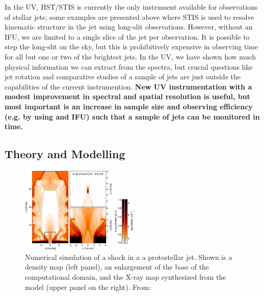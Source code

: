 \documentclass[12pt]{article}
\begin{document}
In the UV, HST/STIS is currently the only instrument available for observations of stellar jets; some examples are presented above where STIS is used to resolve kinematic structure in the jet using long-slit observations. However, without an IFU, we are limited to a single slice of the jet per observation. It is possible to step the long-slit on the sky, but this is prohibitively expensive in observing time for all but one or two of the brightest jets. In the UV, we have shown how much physical information we can extract from the spectra, but crucial questions like jet rotation and comparative studies of a sample of jets are just outside the capabilities of the current instrumention. \textbf{New UV instrumentation with a modest improvement in spectral and spatial resolution is useful, but most important is an increase in sample size and observing efficiency (e.g. by using and IFU) such that a sample of jets can be monitored in time. }

\subsection{Theory and Modelling}
\begin{figure}[htb]
\centering
\includegraphics[width=0.5\textwidth]{apj395310f4_lr.jpg}
\caption{Numerical simulation of a shock in a a protostellar jet. Shown is a density map (left panel), an enlargement of the base of the computational domain, and the X-ray map synthesized from the model (upper panel on the right).  From:}
\label{fig:sims}
\end{figure}
\end{document}
